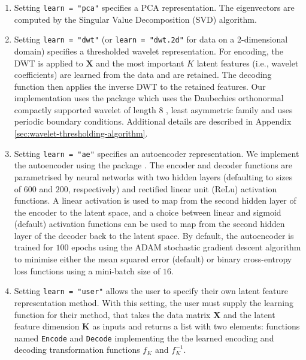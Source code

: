 \begin{enumerate}
    \item Setting \texttt{learn = "pca"} specifies a PCA representation. The eigenvectors are computed by the Singular Value Decomposition (SVD) algorithm.
    \item Setting \texttt{learn = "dwt"} (or \texttt{learn = "dwt.2d"} for data on a 2-dimensional domain) specifies a thresholded wavelet representation. For encoding, the DWT is applied to $\mathbf{X}$ and the most important $K$ latent features (i.e., wavelet coefficients) are learned from the data and are retained. The decoding function then applies the inverse DWT to the retained features. Our implementation uses the   package \parencite{whitcher_waveslim_2024} which uses the Daubechies orthonormal compactly supported wavelet of length $8$ \parencite{daubechies_ten_1992}, least asymmetric family and uses periodic boundary conditions. Additional details are described in Appendix \ref{sec:wavelet-thresholding-algorithm}.
    \item Setting \texttt{learn = "ae"} specifies an autoencoder representation. We implement the autoencoder using the   package \parencite{kalinowski_keras_2024}. The encoder and decoder functions are parametrised by neural networks with two hidden layers (defaulting to sizes of $600$ and $200$, respectively) and rectified linear unit (ReLu) activation functions.
    A linear activation is used to map from the second hidden layer of the encoder to the latent space, and a choice between linear and sigmoid (default) activation functions can be used to map from the second hidden layer of the decoder back to the latent space.
    By default, the autoencoder is trained for $100$ epochs using the ADAM stochastic gradient descent algorithm \parencite{kingma_adam_2017} to minimise either the mean squared error (default) or binary cross-entropy loss functions using a mini-batch size of $16$.
    \item Setting \texttt{learn = "user"} allows the user to specify their own latent feature representation method. With this setting, the user must supply the learning function for their method, that takes the data matrix $\mathbf{X}$ and the latent feature dimension $\mathbf{K}$ as inputs and returns a list with two elements: functions named \texttt{Encode} and \texttt{Decode} implementing the the learned encoding and decoding transformation functions $f_K$ and $f_K^{-1}$.
\end{enumerate}

